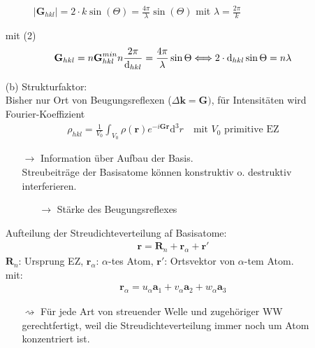 \begin{itemize}
\begin{figure}[H]
        \caption{$|\textbf{G}_{hkl}|=2\cdot k \sin(\Theta) = \frac{4\pi}{\lambda}\sin(\Theta)$ mit $\lambda=\frac{2\pi}{k}$\\ }
        \label{fig:3_3Reflection}
    \end{figure}
    mit (2) 
    \begin{align*}
        \textbf{G}_{hkl} = n \textbf{G}_{hkl}^{min} n\frac{2\pi}{\textnormal{d}_{hkl}} = \frac{4\pi}{\lambda}\sin{\Theta} \Longleftrightarrow 2\cdot \textnormal{d}_{hkl}\sin{\Theta}= n \lambda
    \end{align*}
    \item[(b)] Strukturfaktor:\\
    Bisher nur Ort von Beugungsreflexen ($\Delta \textbf{k} = \textbf{G})$, für Intensitäten wird Fourier-Koeffizient
    \begin{align*}
        \rho_{hkl} = \frac{1}{V_0} \int_{V_0} \rho (\textbf{r}) e^{-i \textbf{G} \textbf{r}} \mathrm{d}^3r \quad \text{mit } V_0 \text{ primitive EZ}
    \end{align*}
    \begin{itemize}
        \item[$\rightarrow$] Information über Aufbau der Basis.\\
        Streubeiträge der Basisatome können konstruktiv o. destruktiv interferieren.
        \begin{itemize}
            \item[$\rightarrow$] Stärke des Beugungsreflexes
        \end{itemize}
    \end{itemize}
    Aufteilung der Streudichteverteilung af Basisatome:
    \begin{align*}
        \textbf{r} = \textbf{R}_n + \textbf{r}_\alpha + \textbf{r}'
    \end{align*}
    $\textbf{R}_n$: Ursprung EZ, $\textbf{r}_\alpha$: $\alpha$-tes Atom, $\textbf{r}'$: Ortsvektor von $\alpha$-tem Atom.\\
    mit:
    \begin{align*}
        \textbf{r}_\alpha = u_\alpha \textbf{a}_1 + v_\alpha \textbf{a}_2 + w_\alpha \textbf{a}_3
    \end{align*}
    \begin{itemize}
        \item[$\rightsquigarrow$] Für jede Art von streuender Welle und zugehöriger WW gerechtfertigt, weil die Streudichteverteilung immer noch um Atom konzentriert ist.
    \end{itemize}

\end{itemize}
